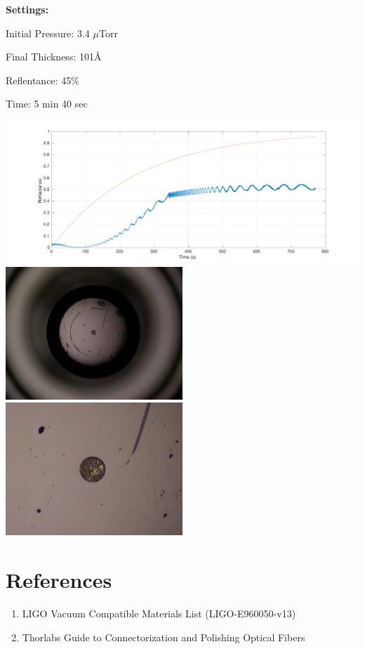 \documentclass{article}
\begin{document}
\textbf{Settings:}

Initial Pressure: 3.4 $\mu$Torr

Final Thickness: 101\AA

Reflentance: 45\%

Time:  5 min 40 sec

\includegraphics[width=\textwidth]{BS_Coating_Fiber_Time.pdf}
\includegraphics[width=0.5\textwidth]{GoldFiberTip.JPG}
\includegraphics[width=0.5\textwidth]{GoldFiberTipZoom.JPG}
\section{References}
\begin{enumerate}
\item LIGO Vacuum Compatible Materials List (LIGO-E960050-v13)
\item Thorlabs Guide to Connectorization and Polishing Optical Fibers 
\end{enumerate}
\end{document}

